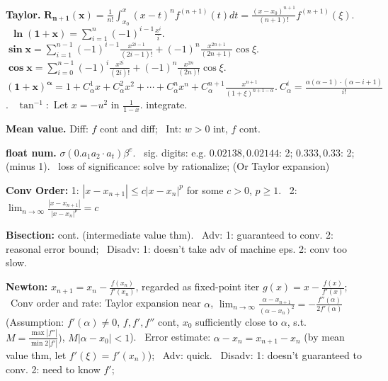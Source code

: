 
\usepackage{epstopdf}
\usepackage{graphics}
\usepackage{subfig}
\usepackage{listings}

\newcommand{\tb}{\textbf}


\tb{Taylor.} $\mathbf{R_{n+1}(x)} = \frac{1}{n!}\int_{x_0}^{x}(x-t)^nf^{(n+1)}(t)dt = \frac{(x-x_0)^{n+1}}{(n+1)!}f^{(n+1)}(\xi) $. ~$\mathbf{\ln(1+x)} = \sum_{i=1}^{n}(-1)^{i-1}\frac{x^i}{i} $. ~$\mathbf{\sin x} = \sum_{i=1}^{n-1}(-1)^{i-1}\frac{x^{2i-1}}{(2i-1)!}+(-1)^n\frac{x^{2n+1}}{(2n+1)}\cos\xi $. ~$\mathbf{\cos x} = \sum_{i=0}^{n-1}(-1)^{i}\frac{x^{2i}}{(2i)!}+(-1)^n\frac{x^{2n}}{(2n)!}\cos\xi $. ~$\mathbf{(1+x)^\alpha} = 1+C_{\alpha}^1x+C_{\alpha}^2x^2+\cdots+C_{\alpha}^nx^n+C_{\alpha}^{n+1}\frac{x^{n+1}}{(1+\xi)^{n+1-\alpha}}. ~C_\alpha^i = \frac{\alpha(\alpha-1)\cdot(\alpha-i+1)}{i!} $. ~$\tan^{-1}: $ Let $x = -u^2 $ in $\frac{1}{1-x}$. integrate.

\tb{Mean value.} Diff: $f$ cont and diff; ~Int: $w > 0$ int, $f$ cont.

\tb{float num.} $\sigma(0.a_1a_2\cdot a_t)\beta^e$. ~sig. digits: e.g. $0.02138, 0.02144$: 2; $0.333, 0.33$: 2; (minus 1).
~loss of significance: solve by rationalize; (Or Taylor expansion)

\tb{Conv Order:} 1: $|x-x_{n+1}|\le c|x-x_{n}|^p $ for some $c > 0$, $p \ge 1$. ~2: $\lim_{n\to\infty}\frac{|x-x_{n+1}|}{|x-x_n|^p} = c $

\tb{Bisection:} cont. (intermediate value thm). ~Adv: 1: guaranteed to conv. 2: reasonal error bound; ~Disadv: 1: doesn't take adv of machine eps. 2: conv too slow.

\tb{Newton:} $x_{n+1} = x_n-\frac{f(x_n)}{f'(x_n)} $, regarded as fixed-point iter $g(x) = x - \frac{f(x)}{f'(x)}$; ~Conv order and rate: Taylor expansion near $\alpha$, $\lim_{n\to\infty}\frac{\alpha-x_{n+1}}{(\alpha-x_n)^2} = -\frac{f''(\alpha)}{2f'(\alpha)} $ (Assumption: $f'(\alpha)\ne 0$, $f, f', f''$ cont, $x_0 $ sufficiently close to $\alpha$, s.t. $M = \frac{\max|f''|}{\min2|f'|})$, $M|\alpha-x_0| < 1$). ~Error estimate: $\alpha-x_n = x_{n+1}-x_n $ (by mean value thm, let $f'(\xi) = f'(x_n)$); ~Adv: quick. ~Disadv: 1: doesn't guaranteed to conv. 2: need to know $f'$;

